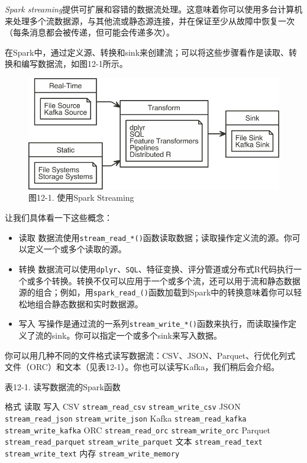 \documentclass[
]{article}
\providecommand{\tightlist}{%
  \setlength{\itemsep}{0pt}\setlength{\parskip}{0pt}}
\begin{document}
\emph{Spark
streaming}提供可扩展和容错的数据流处理。这意味着你可以使用多台计算机来处理多个流数据源，与其他流或静态源连接，并在保证至少从故障中恢复一次（每条消息都会被传递，但可能会传递多次）。

在Spark中，通过定义源、转换和sink来创建流；可以将这些步骤看作是读取、转换和编写数据流，如图12-1所示。

\begin{figure}
\centering
\includegraphics{figures/12_1.png}
\caption{图12-1. 使用Spark Streaming}
\end{figure}

让我们具体看一下这些概念：

\begin{itemize}
\tightlist
\item
  读取
  数据流使用\texttt{stream\_read\_*()}函数读取数据；读取操作定义流的源。你可以定义一个或多个读取的源。
\item
  转换
  数据流可以使用\texttt{dplyr}、\texttt{SQL}、特征变换、评分管道或分布式R代码执行一个或多个转换。转换不仅可以应用于一个或多个流，还可以用于流和静态数据源的组合；例如，用\texttt{spark\_read\_()}函数加载到Spark中的转换意味着你可以轻松地组合静态数据和实时数据源。
\item
  写入
  写操作是通过流的一系列\texttt{stream\_write\_*()}函数来执行，而读取操作定义了流的sink。你可以指定一个或多个sink来写入数据。
\end{itemize}

你可以用几种不同的文件格式读写数据流：CSV、JSON、Parquet、行优化列式文件（ORC）和文本（见表12-1）。你也可以读写Kafka，我们稍后会介绍。

表12-1. 读写数据流的Spark函数

格式\textbar{} 读取 \textbar 写入 CSV
\textbar{}\texttt{stream\_read\_csv}
\textbar{}\texttt{stream\_write\_csv} JSON
\textbar{}\texttt{stream\_read\_json}
\textbar{}\texttt{stream\_write\_json} Kafka
\textbar{}\texttt{stream\_read\_kafka}
\textbar{}\texttt{stream\_write\_kafka} ORC
\textbar{}\texttt{stream\_read\_orc}
\textbar{}\texttt{stream\_write\_orc} Parquet\textbar{}
\texttt{stream\_read\_parquet} \textbar{}\texttt{stream\_write\_parquet}
文本\textbar{} \texttt{stream\_read\_text}
\textbar{}\texttt{stream\_write\_text} 内存\textbar{}
\textbar{}\texttt{stream\_write\_memory}
\end{document}
